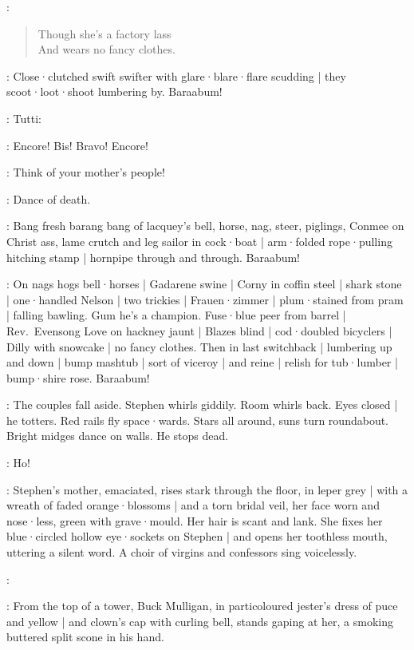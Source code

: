 \Pianola:
\begin{verse}
%
    Though she's a factory lass\\
    And wears no fancy clothes.
\end{verse}

:
Close·clutched swift swifter with glare·blare·flare scudding |
they scoot·loot·shoot lumbering by.
Baraabum!

:
Tutti:

\All:
Encore!
Bis!
Bravo!
Encore!

\Simon[2]:
Think of your mother's people!

\Stephen:
Dance of death.

:
Bang fresh barang bang of lacquey's bell,
%
horse,
nag,
steer,
piglings,
Conmee on Christ ass,
lame crutch and leg sailor in cock·boat |
arm·folded rope·pulling hitching stamp |
hornpipe through and through.
Baraabum!

:
On nags hogs bell·horses |
Gadarene swine |
Corny in coffin steel |
shark stone |
one·handled Nelson |
two trickies |
Frauen·zimmer |
plum·stained from pram |
falling bawling.
Gum he's a champion.
Fuse·blue peer from barrel |
Rev.~Evensong Love on hackney jaunt |
Blazes blind |
cod·doubled bicyclers |
Dilly with snowcake |
no fancy clothes.
Then in last switchback |
lumbering up and down |
bump mashtub |
sort of viceroy |
and reine |
relish for tub·lumber |
bump·shire rose.
%
Baraabum!

:
The couples fall aside.
Stephen whirls giddily.
Room whirls back.
Eyes closed |
he totters.
Red rails fly space·wards.
Stars all around,
suns turn roundabout.
Bright midges dance on walls.
He stops dead.

\Stephen:
Ho!

:
Stephen's mother,
emaciated,
rises stark through the floor,
in leper grey |
with a wreath of faded orange·blossoms |
and a torn bridal veil,
her face worn and nose·less,
green with grave·mould.
Her hair is scant and lank.
%
She fixes her blue·circled hollow eye·sockets on Stephen |
and opens her toothless mouth,
uttering a silent word.
A choir of virgins and confessors sing voicelessly.

\Choir:
\begin{verse}
\end{verse}

:
From the top of a tower,
Buck Mulligan,
in particoloured jester's dress of puce and yellow |
and clown's cap with curling bell,
stands gaping at her,
a smoking buttered split scone in his hand.

